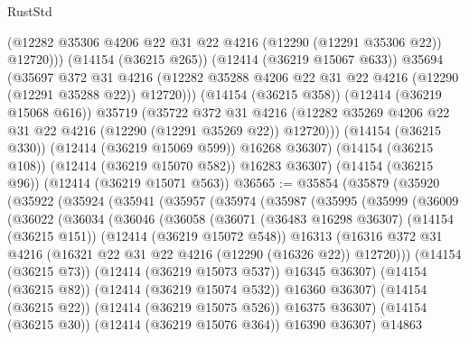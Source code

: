 \begin{lexlean}{RustStd}
\begin{coremodule}
                (@12282 @35306 @4206 @22 @31 @22 @4216 (@12290 (@12291 @35306 @22)) @12720)))
            (@14154 (@36215 @265))
            (@12414 (@36219 @15067 @633))
            @35694
            (@35697
              @372
              @31
              @4216
              (@12282 @35288 @4206 @22 @31 @22 @4216 (@12290 (@12291 @35288 @22)) @12720)))
          (@14154 (@36215 @358))
          (@12414 (@36219 @15068 @616))
          @35719
          (@35722
            @372
            @31
            @4216
            (@12282 @35269 @4206 @22 @31 @22 @4216 (@12290 (@12291 @35269 @22)) @12720)))
        (@14154 (@36215 @330))
        (@12414 (@36219 @15069 @599))
        @16268
        @36307)
      (@14154 (@36215 @108))
      (@12414 (@36219 @15070 @582))
      @16283
      @36307)
    (@14154 (@36215 @96))
    (@12414 (@36219 @15071 @563))
@36565 := @35854
    (@35879
      (@35920
        (@35922
          (@35924
            (@35941
              (@35957
                (@35974
                  (@35987
                    (@35995
                      (@35999
                        (@36009
                          (@36022
                            (@36034
                              (@36046
                                (@36058
                                  (@36071
                                    (@36483 @16298 @36307)
                                    (@14154 (@36215 @151))
                                    (@12414 (@36219 @15072 @548))
                                    @16313
                                    (@16316
                                      @372
                                      @31
                                      @4216
                                      (@16321 @22 @31 @22 @4216 (@12290 (@16326 @22)) @12720)))
                                  (@14154 (@36215 @73))
                                  (@12414 (@36219 @15073 @537))
                                  @16345
                                  @36307)
                                (@14154 (@36215 @82))
                                (@12414 (@36219 @15074 @532))
                                @16360
                                @36307)
                              (@14154 (@36215 @22))
                              (@12414 (@36219 @15075 @526))
                              @16375
                              @36307)
                            (@14154 (@36215 @30))
                            (@12414 (@36219 @15076 @364))
                            @16390
                            @36307)
                          @14863

\end{coremodule}
\end{lexlean}
